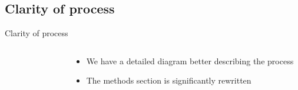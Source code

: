 \documentclass[9pt,aspectratio=169]{beamer}
\begin{document}
\subsection{Clarity of process}

\begin{frame}{Clarity of process}

\begin{columns}
	\begin{column}{0.4\linewidth}
		\begin{figure}
		\end{figure}
		
	\end{column}
	\begin{column}{0.6\linewidth}
		\begin{itemize}
			\item We have a detailed diagram better describing the process
			\item The methods section is significantly rewritten 
		\end{itemize}
	\end{column}
\end{columns}
\end{frame}
\end{document}

